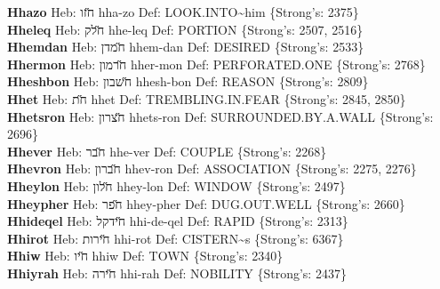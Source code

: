 {\textbf{Hhazo} Heb: {\large\H חזו} hha-zo Def: LOOK.INTO\textasciitilde{}him \{Strong's: 2375\}\hfill{}\\

\textbf{Hheleq} Heb: {\large\H חלק} hhe-leq Def: PORTION \{Strong's: 2507, 2516\}\hfill{}\\

\textbf{Hhemdan} Heb: {\large\H חמדן} hhem-dan Def: DESIRED \{Strong's: 2533\}\hfill{}\\

\textbf{Hhermon} Heb: {\large\H חרמון} hher-mon Def: PERFORATED.ONE \{Strong's: 2768\}\hfill{}\\

\textbf{Hheshbon} Heb: {\large\H חשבון} hhesh-bon Def: REASON \{Strong's: 2809\}\hfill{}\\

\textbf{Hhet} Heb: {\large\H חת} hhet Def: TREMBLING.IN.FEAR \{Strong's: 2845, 2850\}\hfill{}\\

\textbf{Hhetsron} Heb: {\large\H חצרון} hhets-ron Def: SURROUNDED.BY.A.WALL \{Strong's: 2696\}\hfill{}\\

\textbf{Hhever} Heb: {\large\H חבר} hhe-ver Def: COUPLE \{Strong's: 2268\}\hfill{}\\

\textbf{Hhevron} Heb: {\large\H חברון} hhev-ron Def: ASSOCIATION \{Strong's: 2275, 2276\}\hfill{}\\

\textbf{Hheylon} Heb: {\large\H חלון} hhey-lon Def: WINDOW \{Strong's: 2497\}\hfill{}\\

\textbf{Hheypher} Heb: {\large\H חפר} hhey-pher Def: DUG.OUT.WELL \{Strong's: 2660\}\hfill{}\\

\textbf{Hhideqel} Heb: {\large\H חידקל} hhi-de-qel Def: RAPID \{Strong's: 2313\}\hfill{}\\

\textbf{Hhirot} Heb: {\large\H חירות} hhi-rot Def: CISTERN\textasciitilde{}s \{Strong's: 6367\}\hfill{}\\

\textbf{Hhiw} Heb: {\large\H חיו} hhiw Def: TOWN \{Strong's: 2340\}\hfill{}\\

\textbf{Hhiyrah} Heb: {\large\H חירה} hhi-rah Def: NOBILITY \{Strong's: 2437\}\hfill{}\\

}
